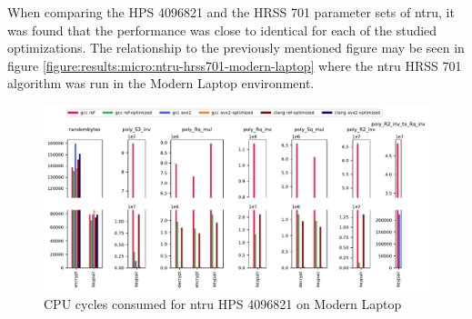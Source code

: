 When comparing the HPS 4096821 and the HRSS 701 parameter sets of \gls{ntru}, it was found that the performance was close to identical for each of the studied optimizations. The relationship to the previously mentioned figure may be seen in figure \ref{figure:results:micro:ntru-hrss701-modern-laptop} where the \gls{ntru} HRSS 701 algorithm was run in the Modern Laptop environment. 

\begin{figure}
    \centering
    \includegraphics[width=\textwidth]{chapters/results/micro/ntru_hps4096821_Modern Laptop_cpu-cycles.pdf}
    \caption{CPU cycles consumed for \gls{ntru} HPS 4096821 on Modern Laptop}
    \label{figure:results:micro:ntru-hps4096821-modern-laptop}
\end{figure}
